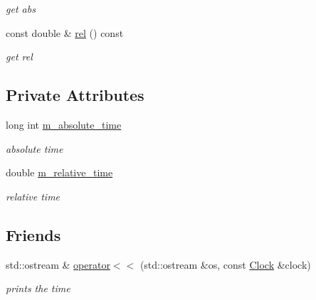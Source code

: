 \begin{DoxyCompactItemize}
\begin{DoxyCompactList}\small\item\em get abs \end{DoxyCompactList}\item 
\hypertarget{classClock_a7da14c0eb922ca5a4bdffb8159ca7b41}{
const double \& \hyperlink{classClock_a7da14c0eb922ca5a4bdffb8159ca7b41}{rel} () const }
\label{classClock_a7da14c0eb922ca5a4bdffb8159ca7b41}

\begin{DoxyCompactList}\small\item\em get rel \end{DoxyCompactList}\end{DoxyCompactItemize}
\subsection*{Private Attributes}
\begin{DoxyCompactItemize}
\item 
\hypertarget{classClock_a378ea759c6757fe17d11e8636df2da3b}{
long int \hyperlink{classClock_a378ea759c6757fe17d11e8636df2da3b}{m\_\-absolute\_\-time}}
\label{classClock_a378ea759c6757fe17d11e8636df2da3b}

\begin{DoxyCompactList}\small\item\em absolute time \end{DoxyCompactList}\item 
\hypertarget{classClock_a5276273aac712ca2f007c19d80f0f014}{
double \hyperlink{classClock_a5276273aac712ca2f007c19d80f0f014}{m\_\-relative\_\-time}}
\label{classClock_a5276273aac712ca2f007c19d80f0f014}

\begin{DoxyCompactList}\small\item\em relative time \end{DoxyCompactList}\end{DoxyCompactItemize}
\subsection*{Friends}
\begin{DoxyCompactItemize}
\item 
\hypertarget{classClock_a725f3e6c50a193ec896ee00bcc84ce04}{
std::ostream \& \hyperlink{classClock_a725f3e6c50a193ec896ee00bcc84ce04}{operator$<$$<$} (std::ostream \&os, const \hyperlink{classClock}{Clock} \&clock)}
\label{classClock_a725f3e6c50a193ec896ee00bcc84ce04}

\begin{DoxyCompactList}\small\item\em prints the time \end{DoxyCompactList}\end{DoxyCompactItemize}


